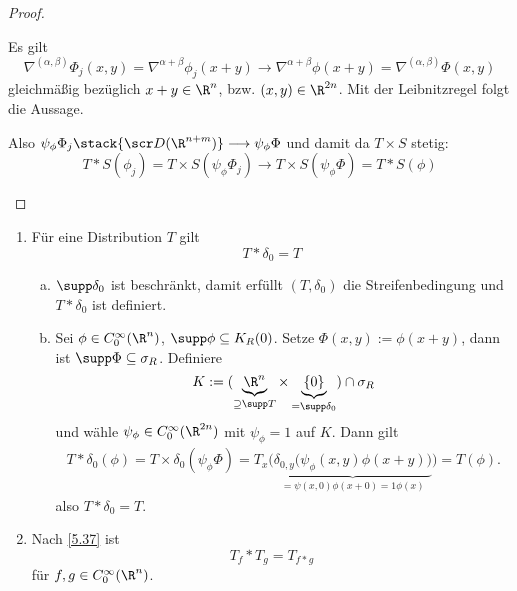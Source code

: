 \begin{st}
\begin{proof}
\begin{enumerate}[1)]
\begin{enumerate}[a)]
\begin{enumerate}[(i)]
								Es gilt
								\[
									\nabla^{(\alpha, \beta)} \Phi_j(x,y)
									= \nabla^{\alpha + \beta} \phi_j(x+y)
									\to \nabla^{\alpha + \beta} \phi (x+y)
									= \nabla^{(\alpha, \beta)} \Phi(x,y)
								\]
								gleichmäßig bezüglich $x+y \in \R^n$, bzw. $(x,y) \in \R^{2n}$.
								Mit der Leibnitzregel folgt die Aussage.
						\end{enumerate}
						Also $\psi_\phi \Phi_j \stack{\scr D(\R^{n+m})}\longrightarrow \psi_\phi \Phi$ und damit da $T \times S$ stetig:
						\[
							T \ast S(\phi_j)
							= T \times S (\psi_\phi \Phi_j)
							\to T \times S(\psi_\phi \Phi)
							= T \ast S(\phi)
						\]
				\end{enumerate}
		\end{enumerate}
	\end{proof}
\end{st}

\begin{ex} \label{5.39}
	\begin{enumerate}[1)]
		\item
			Für eine Distribution $T$ gilt
			\[
				T \ast \delta_0 = T
			\]
			\begin{enumerate}[a)]
				\item
					$\supp \delta_0$ ist beschränkt, damit erfüllt $(T,\delta_0)$ die Streifenbedingung und $T \ast \delta_0$ ist definiert.
				\item
					Sei $\phi \in C_0^\infty(\R^n)$, $\supp \phi \subset K_R(0)$.
					Setze $\Phi(x,y) := \phi(x+y)$, dann ist $\supp \Phi \subset \sigma_R$.
					Definiere
					\[
						K := (\underbrace{\R^n}_{\supset \supp T} \times \underbrace{\{0\}}_{= \supp \delta_0}) \cap \sigma_R
					\]
					und wähle $\psi_\phi \in C_0^\infty(\R^{2n})$ mit $\psi_\phi = 1$ auf $K$.
					Dann gilt
					\begin{align*}
						T \ast \delta_0(\phi)
						= T \times \delta_0 (\psi_\phi \Phi)
						= T_x \Big(\underbrace{\delta_{0,y}\big(\psi_\phi(x,y) \phi(x+y)\big)}_{=\psi (x,0) \phi(x+0) = 1 \phi(x)}\Big)
						= T(\phi).
					\end{align*}
					also $T \ast \delta_0 = T$.
			\end{enumerate}
		\item
			Nach \ref{5.37} ist
			\[
				T_f \ast T_g = T_{f\ast g}
			\]
			für $f,g \in C_0^\infty(\R^n)$.
	\end{enumerate}
\end{ex}



